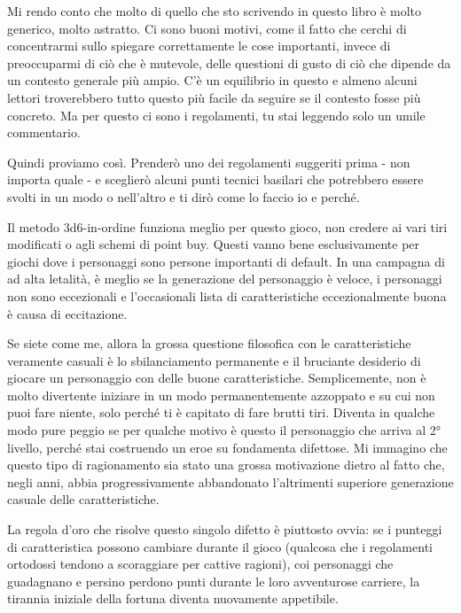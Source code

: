 
Mi rendo conto che molto di quello che sto scrivendo in questo libro è molto generico, molto astratto. Ci sono buoni motivi, come il fatto che cerchi di concentrarmi sullo spiegare correttamente le cose importanti, invece di preoccuparmi di ciò che è mutevole, delle questioni di gusto di ciò che dipende da un contesto generale più ampio. C'è un equilibrio in questo e almeno alcuni lettori troverebbero tutto questo più facile da seguire se il contesto fosse più concreto. Ma per questo ci sono i regolamenti, tu stai leggendo solo un umile commentario.

Quindi proviamo così. Prenderò uno dei regolamenti suggeriti prima - non importa quale - e sceglierò alcuni punti tecnici basilari che potrebbero essere svolti in un modo o nell'altro e ti dirò come lo faccio io e perché.


Il metodo 3d6-in-ordine funziona meglio per questo gioco, non credere ai vari tiri modificati o agli schemi di point buy. Questi vanno bene esclusivamente per giochi dove i personaggi sono persone importanti di default. In una campagna di  ad alta letalità, è meglio se la generazione del personaggio è veloce, i personaggi non sono eccezionali e l'occasionali lista di caratteristiche eccezionalmente buona è causa di eccitazione.

Se siete come me, allora la grossa questione filosofica con le caratteristiche veramente casuali è lo sbilanciamento permanente e il bruciante desiderio di giocare un personaggio con delle buone caratteristiche. Semplicemente, non è molto divertente iniziare in un modo permanentemente azzoppato e su cui non puoi fare niente, solo perché ti è capitato di fare brutti tiri. Diventa in qualche modo pure peggio se per qualche motivo è questo il personaggio che arriva al 2° livello, perché stai costruendo un eroe su fondamenta difettose. Mi immagino che questo tipo di ragionamento sia stato una grossa motivazione dietro al fatto che, negli anni, \dnd{} abbia progressivamente abbandonato l'altrimenti superiore generazione casuale delle caratteristiche.

La regola d'oro che risolve questo singolo difetto è piuttosto ovvia: se i punteggi di caratteristica possono cambiare durante il gioco (qualcosa che i regolamenti ortodossi tendono a scoraggiare per cattive ragioni), coi personaggi che guadagnano e persino perdono punti durante le loro avventurose carriere, la tirannia iniziale della fortuna diventa nuovamente appetibile. 

